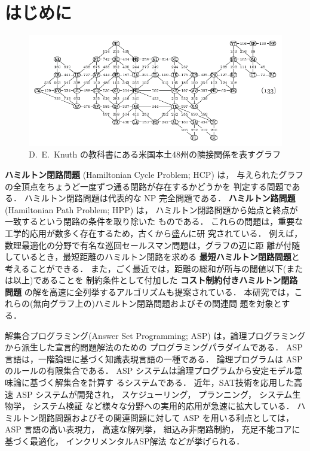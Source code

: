﻿%
\section{はじめに}

\begin{figure}[t]
  \centering
  \includegraphics[width=0.7\linewidth]{fig/taocp_vol4fasc1b_p52_eq133.pdf}
  \caption{D.~E.~Knuth の教科書にある米国本土48州の隣接関係を表すグラフ}
  \label{fig:USmap}
\end{figure}


\textbf{ハミルトン閉路問題} (Hamiltonian Cycle Problem; HCP) は，
与えられたグラフの全頂点をちょうど一度ずつ通る閉路が存在するかどうかを
判定する問題である\cite{hirata15:book}．
ハミルトン閉路問題は代表的な NP 完全問題である．
\textbf{ハミルトン路問題} (Hamiltonian Path Problem; HPP) は，
ハミルトン閉路問題から始点と終点が一致するという閉路の条件を取り除いた
ものである．
これらの問題は，重要な工学的応用が数多く存在するため，古くから盛んに研
究されている．
例えば，数理最適化の分野で有名な巡回セールスマン問題は，グラフの辺に距
離が付随しているとき，最短距離のハミルトン閉路を求める
\textbf{最短ハミルトン閉路問題}と考えることができる．
また，ごく最近では，距離の総和が所与の閾値以下(または以上)であることを
制約条件として付加した
\textbf{コスト制約付きハミルトン閉路問題}
の解を高速に全列挙するアルゴリズムも提案されている\cite{comp20:Minato}．
本研究では，これらの(無向グラフ上の)ハミルトン閉路問題およびその関連問
題を対象とする．

解集合プログラミング(Answer Set Programming; ASP\cite{%
  Baral03:cambridge,%
  Gelfond88:iclp,%
  Inoue08:jssst,%
  Niemela99:amai})
は，論理プログラミングから派生した宣言的問題解法のための
プログラミングパラダイムである．
ASP言語は，一階論理に基づく知識表現言語の一種である．
論理プログラムは ASP のルールの有限集合である．
ASP システムは論理プログラムから安定モデル意味論に基づく解集合を計算す
るシステムである．
近年，SAT技術を応用した高速 ASP システムが開発され，
スケジューリング，
プランニング，
システム生物学，
システム検証
など様々な分野への実用的応用が急速に拡大している．
%
ハミルトン閉路問題およびその関連問題に対して ASP を用いる利点としては，
ASP 言語の高い表現力，
高速な解列挙，
組込み非閉路制約，
充足不能コアに基づく最適化，
インクリメンタルASP解法
などが挙げられる．

